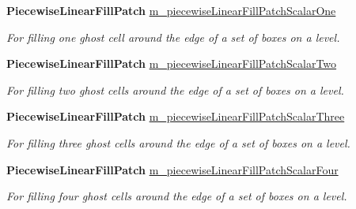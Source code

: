 \begin{DoxyCompactItemize}
\mbox{\label{class_a_m_r_level_mushy_layer_abc59bddccf6b536b195c6abde9e9d43b}} 
\textbf{ Piecewise\+Linear\+Fill\+Patch} \hyperlink{class_a_m_r_level_mushy_layer_abc59bddccf6b536b195c6abde9e9d43b}{m\+\_\+piecewise\+Linear\+Fill\+Patch\+Scalar\+One}
\begin{DoxyCompactList}\small\item\em For filling one ghost cell around the edge of a set of boxes on a level. \end{DoxyCompactList}\item 
\mbox{\label{class_a_m_r_level_mushy_layer_a6fcadf643df6101f6afe8b5bd02f2ed9}} 
\textbf{ Piecewise\+Linear\+Fill\+Patch} \hyperlink{class_a_m_r_level_mushy_layer_a6fcadf643df6101f6afe8b5bd02f2ed9}{m\+\_\+piecewise\+Linear\+Fill\+Patch\+Scalar\+Two}
\begin{DoxyCompactList}\small\item\em For filling two ghost cells around the edge of a set of boxes on a level. \end{DoxyCompactList}\item 
\mbox{\label{class_a_m_r_level_mushy_layer_abcee4b91b783bddf5ae1f09241cd541b}} 
\textbf{ Piecewise\+Linear\+Fill\+Patch} \hyperlink{class_a_m_r_level_mushy_layer_abcee4b91b783bddf5ae1f09241cd541b}{m\+\_\+piecewise\+Linear\+Fill\+Patch\+Scalar\+Three}
\begin{DoxyCompactList}\small\item\em For filling three ghost cells around the edge of a set of boxes on a level. \end{DoxyCompactList}\item 
\mbox{\label{class_a_m_r_level_mushy_layer_a0a3e3a06973c6e07439953cdcde42275}} 
\textbf{ Piecewise\+Linear\+Fill\+Patch} \hyperlink{class_a_m_r_level_mushy_layer_a0a3e3a06973c6e07439953cdcde42275}{m\+\_\+piecewise\+Linear\+Fill\+Patch\+Scalar\+Four}
\begin{DoxyCompactList}\small\item\em For filling four ghost cells around the edge of a set of boxes on a level. \end{DoxyCompactList}\item 
\mbox{\label{class_a_m_r_level_mushy_layer_aba35ef990a5a51e81af28856f9bfd095}} 

\end{DoxyCompactItemize}
